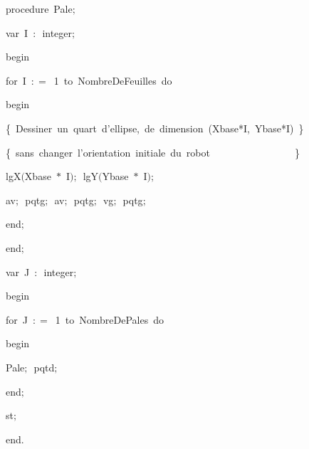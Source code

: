 {\pagebreak[3] 
\vspace{\neglskip}\mbox{\blc  \blk\idt  \mcl procedure\idt \ Pale$;$}\par 
\pagebreak[3] 
\vspace{\neglskip}\mbox{\blc  \blk\blk\idt  \mcl var\idt \ I\ $:$\ integer$;$}\par 
\vspace{\neglskip}\mbox{\blc  \blk\idt  \mcl begin\idt }\par 
\pagebreak[3] 
\vspace{\neglskip}\mbox{\blc  \blk\blk\idt  \mcl for\idt \ I\ $:$$=$\ 1\ \mcl to\idt \ NombreDeFeuilles\ \mcl do\idt \ }\par 
\vspace{\neglskip}\mbox{\blc  \blk\blk\blk\idt  \mcl begin\idt }\par 
\vspace{\neglskip}\mbox{\blc  \blk\blk\blk\blk\idt  \cmt  \{\ Dessiner\ un\ quart\ d{'}ellipse,\ de\ dimension\ (Xbase*I,\ Ybase*I)\ \}\idt }\par 
\vspace{\neglskip}\mbox{\blc  \blk\blk\blk\blk\idt  \cmt  \{\ sans\ changer\ l{'}orientation\ initiale\ du\ robot\ \ \ \ \ \ \ \ \ \ \ \ \ \ \ \ \ \}\idt }\par 
\vspace{\neglskip}\mbox{\blc  \blk\blk\blk\blk\idt  lgX$($Xbase\ $\ast$\ I$)$$;$\ lgY$($Ybase\ $\ast$\ I$)$$;$\ }\par 
\vspace{\neglskip}\mbox{\blc  \blk\blk\blk\blk\idt  av$;$\ pqtg$;$\ av$;$\ pqtg$;$\ vg$;$\ pqtg$;$\ }\par 
\vspace{\neglskip}\mbox{\blc  \blk\blk\blk\idt  \mcl end\idt $;$}\par 
\vspace{\neglskip}\mbox{\blc  \blk\idt  \mcl end\idt $;$}\par 
\medskip

\pagebreak[3] 
\vspace{\neglskip}\mbox{\blc  \blk\idt  \mcl var\idt \ J\ $:$\ integer$;$}\par 
\medskip

\vspace{\neglskip}\mbox{\blc  \idt  \mcl begin\idt }\par 
\pagebreak[3] 
\vspace{\neglskip}\mbox{\blc  \blk\idt  \mcl for\idt \ J\ $:$$=$\ 1\ \mcl to\idt \ NombreDePales\ \mcl do\idt }\par 
\vspace{\neglskip}\mbox{\blc  \blk\blk\idt  \mcl begin\idt }\par 
\vspace{\neglskip}\mbox{\blc  \blk\blk\blk\idt  Pale$;$\ pqtd$;$\ }\par 
\vspace{\neglskip}\mbox{\blc  \blk\blk\idt  \mcl end\idt $;$}\par 
\vspace{\neglskip}\mbox{\blc  \blk\idt  st$;$}\par 
\vspace{\neglskip}\mbox{\blc  \idt  \mcl end\idt $.$}\par 

\medskip }

